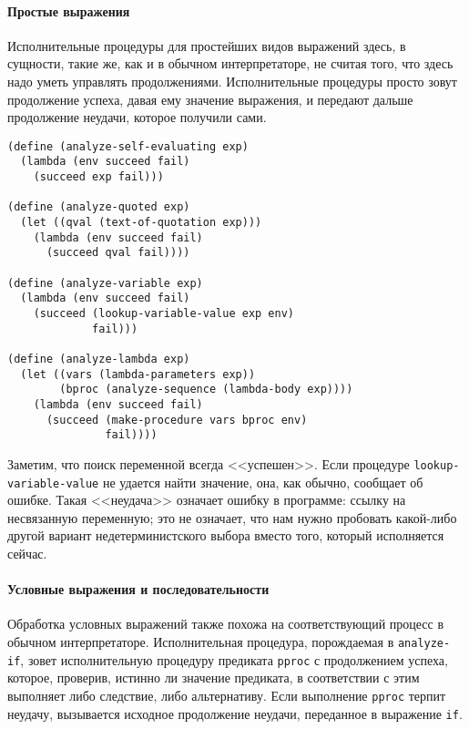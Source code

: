 \paragraph{Простые выражения}


Исполнительные процедуры для простейших видов выражений здесь,
в сущности, такие же, как и в обычном интерпретаторе, не считая
того, что здесь надо уметь управлять продолжениями.  Исполнительные
процедуры просто зовут продолжение успеха, давая ему значение выражения,
и передают дальше продолжение неудачи, которое получили 
сами.
\begin{Verbatim}[fontsize=\small]
(define (analyze-self-evaluating exp)
  (lambda (env succeed fail)
    (succeed exp fail)))

(define (analyze-quoted exp)
  (let ((qval (text-of-quotation exp)))
    (lambda (env succeed fail)
      (succeed qval fail))))

(define (analyze-variable exp)
  (lambda (env succeed fail)
    (succeed (lookup-variable-value exp env)
             fail)))

(define (analyze-lambda exp)
  (let ((vars (lambda-parameters exp))
        (bproc (analyze-sequence (lambda-body exp))))
    (lambda (env succeed fail)
      (succeed (make-procedure vars bproc env)
               fail))))
\end{Verbatim}

Заметим, что поиск переменной всегда <<успешен>>.  Если
процедуре {\tt lookup-va\-riable-value} не удается найти
значение, она, как обычно, сообщает об ошибке.
Такая <<неудача>> означает ошибку в программе: ссылку на несвязанную 
переменную; это
не означает, что нам нужно пробовать какой-либо другой вариант
недетерминистского выбора вместо того, который исполняется сейчас.

\paragraph{Условные выражения и последовательности}

Обработка условных выражений также похожа на
соответствующий процесс в обычном интерпретаторе.  Исполнительная процедура,
порождаемая в {\tt analyze-if}, зовет исполнительную процедуру
предиката {\tt pproc} с продолжением успеха, которое, проверив,
истинно ли значение предиката, в соответствии с этим выполняет либо
следствие, либо альтернативу.  Если выполнение {\tt pproc}
терпит неудачу, вызывается исходное продолжение неудачи, переданное в
выражение {\tt if}.

